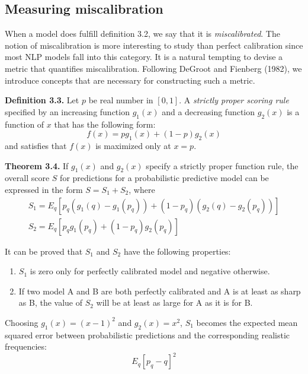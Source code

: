 \subsection{Measuring miscalibration}

When a model does fulfill definition 3.2, we say that it is \textit{miscalibrated}. The notion of miscalibration is more interesting to study than perfect calibration since most NLP models fall into this category. It is a natural tempting to devise a metric that quantifies miscalibration. Following DeGroot and Fienberg (1982), we introduce concepts that are necessary for constructing such a metric.

\textbf{Definition 3.3.} Let $p$ be real number in $[0, 1]$. A \textit{strictly proper scoring rule} specified by an increasing function $g_1(x)$ and a decreasing function $g_2(x)$ is a function of $x$ that has the following form:
\begin{equation}
    \displaystyle f(x) = pg_1(x) + (1 - p)g_2(x)
    \label{eqn:proper_rule}
\end{equation}
and satisfies that $f(x)$ is maximized only at $x = p$.

\textbf{Theorem 3.4.} If $g_1(x)$ and $g_2(x)$ specify a strictly proper function rule, the overall score $S$ for predictions for a probabilistic predictive model can be expressed in the form $S = S_1 + S_2$, where
\begin{equation}    
  \begin{array}{l}
    S_1 = E_{q}\left[p_q\left(g_1(q) - g_1(p_q)\right) + \left(1 - p_q\right)\left(g_2(q) - g_2(p_q)\right)\right] \\ 
    S_2 = E_{q}\left[p_qg_1(p_q) + \left(1 - p_q\right)g_2(p_q)\right]
  \end{array}
  \label{eqn:general_metric}
\end{equation}

It can be proved that $S_1$ and $S_2$ have the following properties: 
\begin{enumerate}
  \item $S_1$ is zero only for perfectly calibrated model and negative otherwise.
  \item If two model A and B are both perfectly calibrated and A is at least as sharp as B, the value of $S_2$ will be at least as large for A as it is for B.
\end{enumerate}

Choosing $g_1(x) = (x - 1)^2$ and $g_2(x) = x^2$, $S_1$ becomes the expected mean squared error between probabilistic predictions and the corresponding realistic frequencies:
$$E_{q}[p_q - q]^2$$

